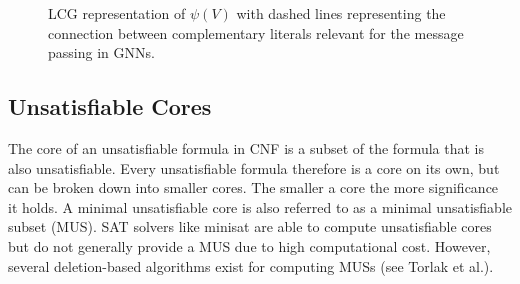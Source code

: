 \begin{figure}[h]
    \centering
    \caption{LCG representation of $\psi(V)$ with dashed lines representing the connection between complementary literals relevant for the message passing in GNNs.}
    \label{fig:lcg-sat}
\end{figure}


\subsection{Unsatisfiable Cores}
The core of an unsatisfiable formula in CNF is a subset of the formula that is also unsatisfiable. Every unsatisfiable formula therefore is a core on its own, but can be broken down into smaller cores. The smaller a core the more significance it holds. A minimal unsatisfiable core is also referred to as a minimal unsatisfiable subset (MUS). SAT solvers like minisat\cite{een2003extensible} are able to compute unsatisfiable cores but do not generally provide a MUS due to high computational cost. However, several deletion-based algorithms exist for computing MUSs (see Torlak et al.\cite{10.1007/978-3-540-68237-0_23}).

